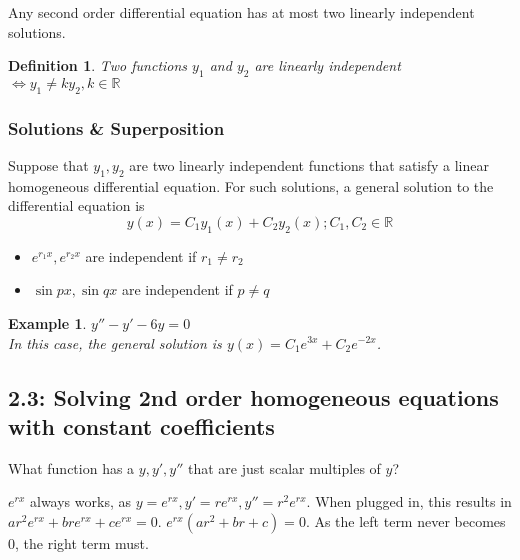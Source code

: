 \documentclass{article}
\newtheorem{definition}{Definition}
\newtheorem{example}{Example}
\begin{document}
Any second order differential equation has at most two linearly independent solutions.
\begin{definition}
	Two functions $y_1$ and $y_2$ are linearly independent $\iff y_1 \neq ky_2, k \in \mathbb{R}$
\end{definition}

\subsubsection{Solutions \& Superposition}
Suppose that $y_1, y_2$ are two linearly independent functions that satisfy a linear homogeneous differential equation. For such solutions, a general solution to the differential equation is 
\begin{equation} y(x)=C_1 y_1(x)+C_2 y_2(x); C_1,C_2 \in \mathbb{R} \end{equation}

\begin{itemize}
	\item $e^{r_1 x},e^{r_2 x}$ are independent if $r_1 \neq r_2 $
	\item $\sin{px}, \sin{qx}$ are independent if $p \neq q$
\end{itemize}

\begin{example} $y''-y'-6y=0$
	\\ In this case, the general solution is $y(x)=C_1e^{3x}+C_2e^{-2x}$.
\end{example}

\subsection{2.3: Solving 2nd order homogeneous equations with constant coefficients}

	What function has a $y, y', y''$ that are just scalar multiples of $y$?
	
	$e^{rx}$ always works, as $y=e^{rx}, y'=re^{rx}, y''=r^2e^{rx}$. When plugged in, this results in $ar^2e^{rx}+bre^{rx}+ce^{rx}=0$. $e^{rx}(ar^2+br+c)=0$. As the left term never becomes 0, the right term must.
	
\end{document}
